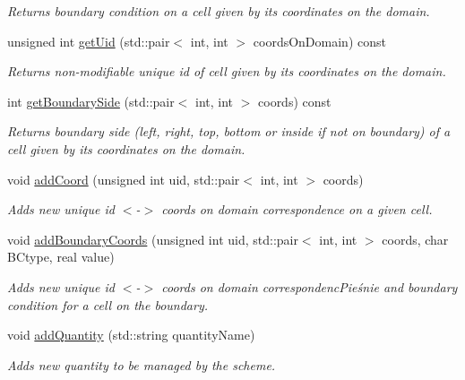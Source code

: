 \begin{DoxyCompactItemize}
\begin{DoxyCompactList}\small\item\em Returns boundary condition on a cell given by its coordinates on the domain. \end{DoxyCompactList}\item 
\mbox{\label{classDomain_a657f0b6750e14d1d3cde6afd8b1e9b48}} 
unsigned int \hyperlink{classDomain_a657f0b6750e14d1d3cde6afd8b1e9b48}{get\+Uid} (std\+::pair$<$ int, int $>$ coords\+On\+Domain) const
\begin{DoxyCompactList}\small\item\em Returns non-\/modifiable unique id of cell given by its coordinates on the domain. \end{DoxyCompactList}\item 
\mbox{\label{classDomain_a677ba729e74d00b167b51ab6c921782a}} 
int \hyperlink{classDomain_a677ba729e74d00b167b51ab6c921782a}{get\+Boundary\+Side} (std\+::pair$<$ int, int $>$ coords) const
\begin{DoxyCompactList}\small\item\em Returns boundary side (left, right, top, bottom or inside if not on boundary) of a cell given by its coordinates on the domain. \end{DoxyCompactList}\item 
void \hyperlink{classDomain_a1463e043dbcda6e6755dda83c26d6b73}{add\+Coord} (unsigned int uid, std\+::pair$<$ int, int $>$ coords)
\begin{DoxyCompactList}\small\item\em Adds new unique id $<$-\/$>$ coords on domain correspondence on a given cell. \end{DoxyCompactList}\item 
void \hyperlink{classDomain_a139f4270151467a3380922e98c644f79}{add\+Boundary\+Coords} (unsigned int uid, std\+::pair$<$ int, int $>$ coords, char B\+Ctype, real value)
\begin{DoxyCompactList}\small\item\em Adds new unique id $<$-\/$>$ coords on domain correspondenc\+Pieśnie and boundary condition for a cell on the boundary. \end{DoxyCompactList}\item 
void \hyperlink{classDomain_a9c33ac08523c95967ad2a51c59fd8d96}{add\+Quantity} (std\+::string quantity\+Name)
\begin{DoxyCompactList}\small\item\em Adds new quantity to be managed by the scheme. \end{DoxyCompactList}\item 

\end{DoxyCompactItemize}
